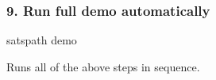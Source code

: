 \documentclass[
]{article}
\newenvironment{Shaded}{}{}
\newcommand{\ExtensionTok}[1]{#1}
\newcommand{\NormalTok}[1]{#1}
\begin{document}
\hypertarget{run-full-demo-automatically}{%
\subsubsection{9. Run full demo
automatically}\label{run-full-demo-automatically}}

\begin{Shaded}
\begin{Highlighting}[]
\ExtensionTok{satspath}\NormalTok{ demo}
\end{Highlighting}
\end{Shaded}

Runs all of the above steps in sequence.
\end{document}
